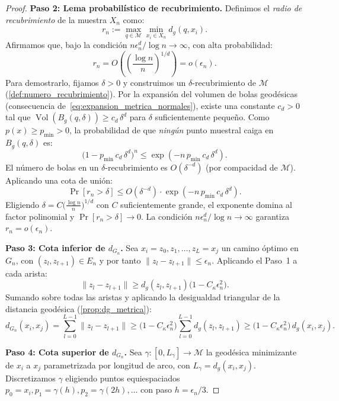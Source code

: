 \begin{proof}
	\textbf{Paso 2: Lema probabilístico de recubrimiento.}
	Definimos el \emph{radio de recubrimiento} de la muestra $X_n$ como:
	\[
	r_n := \max_{q \in \mathcal{M}} \min_{x_i \in X_n} d_g(q, x_i).
	\]
	Afirmamos que, bajo la condición $n\epsilon_n^d / \log n \to \infty$, con alta probabilidad:
	\begin{equation}\label{eq:radio_recubrimiento}
	r_n = O\!\left(\left(\frac{\log n}{n}\right)^{1/d}\right) = o(\epsilon_n).
	\end{equation}
	Para demostrarlo, fijamos $\delta > 0$ y construimos un $\delta$-recubrimiento de $\mathcal{M}$ (\autoref{def:numero_recubrimiento}). Por la expansión del volumen de bolas geodésicas (consecuencia de~\eqref{eq:expansion_metrica_normales}), existe una constante $c_d > 0$ tal que $\operatorname{Vol}(B_g(q, \delta)) \geq c_d \, \delta^d$ para $\delta$ suficientemente pequeño. Como $p(x) \geq p_{\min} > 0$, la probabilidad de que \emph{ningún} punto muestral caiga en $B_g(q, \delta)$ es:
	\[
	\bigl(1 - p_{\min} \, c_d \, \delta^d\bigr)^n \leq \exp(-n \, p_{\min} \, c_d \, \delta^d).
	\]
	El número de bolas en un $\delta$-recubrimiento es $O(\delta^{-d})$ (por compacidad de $\mathcal{M}$). Aplicando una cota de unión:
	\[
	\Pr[r_n > \delta] \leq O(\delta^{-d}) \cdot \exp(-n \, p_{\min} \, c_d \, \delta^d).
	\]
	Eligiendo $\delta = C\bigl(\frac{\log n}{n}\bigr)^{1/d}$ con $C$ suficientemente grande, el exponente domina al factor polinomial y $\Pr[r_n > \delta] \to 0$. La condición $n\epsilon_n^d/\log n \to \infty$ garantiza $r_n = o(\epsilon_n)$.

	\textbf{Paso 3: Cota inferior de $d_{G_n}$.}
	Sea $x_i = z_0, z_1, \ldots, z_L = x_j$ un camino óptimo en $G_n$, con $(z_l, z_{l+1}) \in E_n$ y por tanto $\|z_l - z_{l+1}\| \leq \epsilon_n$. Aplicando el Paso~1 a cada arista:
	\[
	\|z_l - z_{l+1}\| \geq d_g(z_l, z_{l+1})\bigl(1 - C_\kappa \epsilon_n^2\bigr).
	\]
	Sumando sobre todas las aristas y aplicando la desigualdad triangular de la distancia geodésica (\autoref{prop:dg_metrica}):
	\begin{equation}\label{eq:cota_inferior_dGn}
	d_{G_n}(x_i, x_j) = \sum_{l=0}^{L-1} \|z_l - z_{l+1}\| \geq \bigl(1 - C_\kappa \epsilon_n^2\bigr) \sum_{l=0}^{L-1} d_g(z_l, z_{l+1}) \geq \bigl(1 - C_\kappa \epsilon_n^2\bigr) \, d_g(x_i, x_j).
	\end{equation}

	\textbf{Paso 4: Cota superior de $d_{G_n}$.}
	Sea $\gamma: [0, L_\gamma] \to \mathcal{M}$ la geodésica minimizante de $x_i$ a $x_j$ parametrizada por longitud de arco, con $L_\gamma = d_g(x_i, x_j)$. Discretizamos $\gamma$ eligiendo puntos equiespaciados $p_0 = x_i, p_1 = \gamma(h), p_2 = \gamma(2h), \ldots$ con paso $h = \epsilon_n/3$.


\end{proof}
